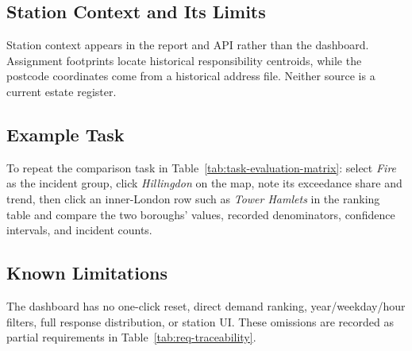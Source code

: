 \subsection{Station Context and Its Limits}

Station context appears in the report and API rather than the dashboard. Assignment footprints locate historical responsibility centroids, while the postcode coordinates come from a historical address file. Neither source is a current estate register.

\subsection{Example Task}

To repeat the comparison task in Table~\ref{tab:task-evaluation-matrix}: select \emph{Fire} as the incident group, click \emph{Hillingdon} on the map, note its exceedance share and trend, then click an inner-London row such as \emph{Tower Hamlets} in the ranking table and compare the two boroughs' values, recorded denominators, confidence intervals, and incident counts.

\subsection{Known Limitations}

The dashboard has no one-click reset, direct demand ranking, year/weekday/hour filters, full response distribution, or station UI. These omissions are recorded as partial requirements in Table~\ref{tab:req-traceability}.
